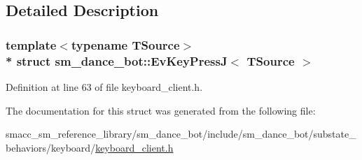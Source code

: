 \subsection{Detailed Description}
\subsubsection*{template$<$typename T\+Source$>$\\*
struct sm\+\_\+dance\+\_\+bot\+::\+Ev\+Key\+Press\+J$<$ T\+Source $>$}



Definition at line 63 of file keyboard\+\_\+client.\+h.



The documentation for this struct was generated from the following file\+:\begin{DoxyCompactItemize}
\item 
smacc\+\_\+sm\+\_\+reference\+\_\+library/sm\+\_\+dance\+\_\+bot/include/sm\+\_\+dance\+\_\+bot/substate\+\_\+behaviors/keyboard/\hyperlink{keyboard__client_8h}{keyboard\+\_\+client.\+h}\end{DoxyCompactItemize}
